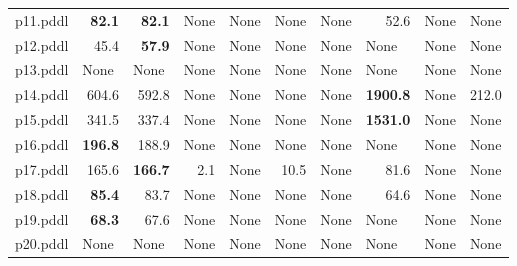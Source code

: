 \documentclass{article}
\begin{document}
\begin{tabular}{@{}lrrrrrrrrr@{}}
p11.pddl & \textbf{82.1} & \textbf{82.1} & \multicolumn{1}{|l|}{None} & \multicolumn{1}{|l|}{None} & \multicolumn{1}{|l|}{None} & \multicolumn{1}{|l|}{None} & 52.6 & \multicolumn{1}{|l|}{None} & \multicolumn{1}{|l|}{None} \\
p12.pddl & 45.4 & \textbf{57.9} & \multicolumn{1}{|l|}{None} & \multicolumn{1}{|l|}{None} & \multicolumn{1}{|l|}{None} & \multicolumn{1}{|l|}{None} & \multicolumn{1}{|l|}{None} & \multicolumn{1}{|l|}{None} & \multicolumn{1}{|l|}{None} \\
p13.pddl & \multicolumn{1}{|l|}{None} & \multicolumn{1}{|l|}{None} & \multicolumn{1}{|l|}{None} & \multicolumn{1}{|l|}{None} & \multicolumn{1}{|l|}{None} & \multicolumn{1}{|l|}{None} & \multicolumn{1}{|l|}{None} & \multicolumn{1}{|l|}{None} & \multicolumn{1}{|l|}{None} \\
p14.pddl & 604.6 & 592.8 & \multicolumn{1}{|l|}{None} & \multicolumn{1}{|l|}{None} & \multicolumn{1}{|l|}{None} & \multicolumn{1}{|l|}{None} & \textbf{1900.8} & \multicolumn{1}{|l|}{None} & 212.0 \\
p15.pddl & 341.5 & 337.4 & \multicolumn{1}{|l|}{None} & \multicolumn{1}{|l|}{None} & \multicolumn{1}{|l|}{None} & \multicolumn{1}{|l|}{None} & \textbf{1531.0} & \multicolumn{1}{|l|}{None} & \multicolumn{1}{|l|}{None} \\
p16.pddl & \textbf{196.8} & 188.9 & \multicolumn{1}{|l|}{None} & \multicolumn{1}{|l|}{None} & \multicolumn{1}{|l|}{None} & \multicolumn{1}{|l|}{None} & \multicolumn{1}{|l|}{None} & \multicolumn{1}{|l|}{None} & \multicolumn{1}{|l|}{None} \\
p17.pddl & 165.6 & \textbf{166.7} & 2.1 & \multicolumn{1}{|l|}{None} & 10.5 & \multicolumn{1}{|l|}{None} & 81.6 & \multicolumn{1}{|l|}{None} & \multicolumn{1}{|l|}{None} \\
p18.pddl & \textbf{85.4} & 83.7 & \multicolumn{1}{|l|}{None} & \multicolumn{1}{|l|}{None} & \multicolumn{1}{|l|}{None} & \multicolumn{1}{|l|}{None} & 64.6 & \multicolumn{1}{|l|}{None} & \multicolumn{1}{|l|}{None} \\
p19.pddl & \textbf{68.3} & 67.6 & \multicolumn{1}{|l|}{None} & \multicolumn{1}{|l|}{None} & \multicolumn{1}{|l|}{None} & \multicolumn{1}{|l|}{None} & \multicolumn{1}{|l|}{None} & \multicolumn{1}{|l|}{None} & \multicolumn{1}{|l|}{None} \\
p20.pddl & \multicolumn{1}{|l|}{None} & \multicolumn{1}{|l|}{None} & \multicolumn{1}{|l|}{None} & \multicolumn{1}{|l|}{None} & \multicolumn{1}{|l|}{None} & \multicolumn{1}{|l|}{None} & \multicolumn{1}{|l|}{None} & \multicolumn{1}{|l|}{None} & \multicolumn{1}{|l|}{None} \\
\end{tabular}
\end{document}
